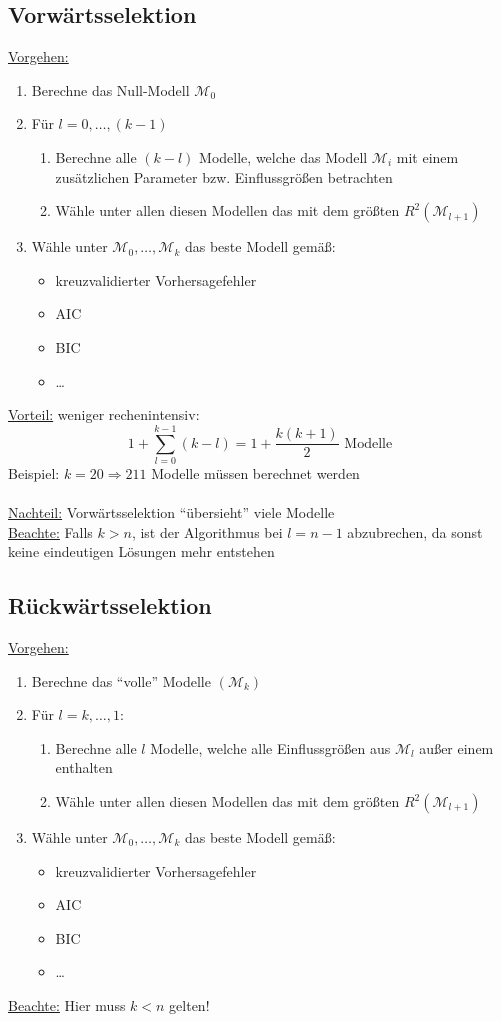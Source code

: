 \documentclass[10pt]{report}
\theoremstyle{definition}
\begin{document}
\subsection{Vorwärtsselektion}
\underline{Vorgehen:} 
\begin{enumerate}
	\item Berechne das Null-Modell $\mathcal{M}_0$
	\item Für $l=0,\dots,(k-1)$
		\begin{enumerate}
			\item Berechne alle $(k-l)$ Modelle, welche das Modell $\mathcal{M}_i$ mit einem zusätzlichen Parameter bzw. Einflussgrößen betrachten
			\item Wähle unter allen diesen Modellen das mit dem größten $R^{2} (\mathcal{M}_{l+1})$
		\end{enumerate}
	\item Wähle unter $\mathcal{M}_0,\dots,\mathcal{M}_k$ das beste Modell gemäß:
		\begin{itemize}
			\item kreuzvalidierter Vorhersagefehler
			\item AIC
			\item BIC
			\item \dots
		\end{itemize}
\end{enumerate}
\underline{Vorteil:} weniger rechenintensiv:
\[ 1 + \sum\limits_{l=0}^{k-1} (k-l)=1+ \frac{k(k+1)}{2} \text{ Modelle}\]
Beispiel: $k=20 \Rightarrow 211$ Modelle müssen berechnet werden \\ \\
\underline{Nachteil:} Vorwärtsselektion ``übersieht'' viele Modelle  \\
\underline{Beachte:} Falls $k > n$, ist der Algorithmus bei $l=n-1$ abzubrechen, da sonst keine eindeutigen Lösungen mehr entstehen

\subsection{Rückwärtsselektion}
\underline{Vorgehen:}
\begin{enumerate}
	\item Berechne das ``volle'' Modelle $(\mathcal{M}_k)$
	\item Für $l=k,\dots,1:$
		\begin{enumerate}
			\item Berechne alle $l$ Modelle, welche alle Einflussgrößen aus $\mathcal{M}_l$ außer einem enthalten
			\item Wähle unter allen diesen Modellen das mit dem größten $R^{2} (\mathcal{M}_{l+1})$
		\end{enumerate}
	\item Wähle unter $\mathcal{M}_0,\dots,\mathcal{M}_k$ das beste Modell gemäß:
		\begin{itemize}
			\item kreuzvalidierter Vorhersagefehler
			\item AIC
			\item BIC
			\item \dots
		\end{itemize}
\end{enumerate}
\underline{Beachte:} Hier muss $k < n$ gelten!
\end{document}
